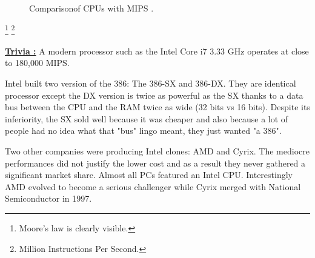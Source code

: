\documentclass[book.tex]{subfiles}
\begin{document}
\begin{figure}[H]
\centering
   \caption{Comparison\protect\footnotemark  of CPUs with MIPS \protect\footnotemark.}
 \end{figure}
 \footnote{Moore's law is clearly visible.}
 \footnote{Million Instructions Per Second.}
 
 \par
  \textbf{\underline{Trivia :}} A modern processor such as the Intel Core i7 3.33 GHz operates at close to 180,000 MIPS.\\
  \par
 Intel built two version of the 386: The 386-SX and 386-DX. They are identical processor except the DX version is twice as powerful as the SX thanks to a data bus between the CPU and the RAM twice as wide (32 bits vs 16 bits). Despite its inferiority, the SX sold well because it was cheaper and also because a lot of people had no idea what that "bus" lingo meant, they just wanted "a 386".\\
 \par
Two other companies were producing Intel clones: AMD and Cyrix. The mediocre performances did not justify the lower cost and as a result they never gathered a significant market share. Almost all PCs featured an Intel CPU. Interestingly AMD evolved to become a serious challenger while Cyrix merged with National Semiconductor in 1997.\\
\par
\end{document}
